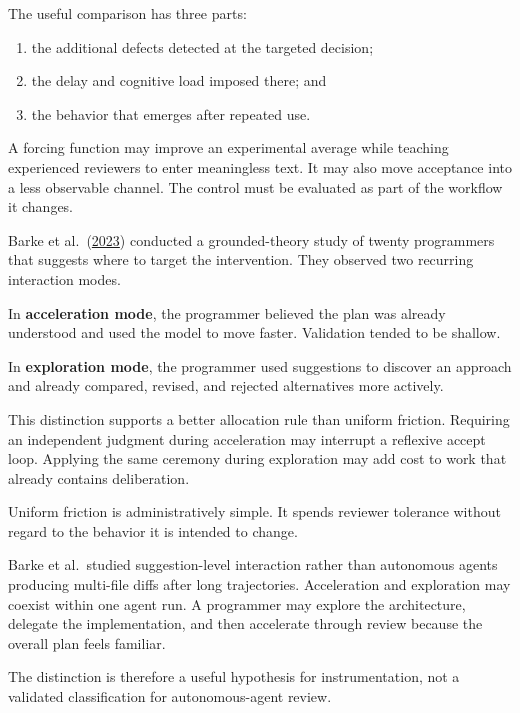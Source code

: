 
The useful comparison has three parts:

\begin{enumerate}
\def\labelenumi{\arabic{enumi}.}
\tightlist
\item
  the additional defects detected at the targeted decision;
\item
  the delay and cognitive load imposed there; and
\item
  the behavior that emerges after repeated use.
\end{enumerate}

A forcing function may improve an experimental average while teaching experienced reviewers to enter meaningless text. It may also move acceptance into a less observable channel. The control must be evaluated as part of the workflow it changes.

Barke et al.~(\href{https://arxiv.org/abs/2206.15000}{2023}) conducted a grounded-theory study of twenty programmers that suggests where to target the intervention. They observed two recurring interaction modes.

In \textbf{acceleration mode}, the programmer believed the plan was already understood and used the model to move faster. Validation tended to be shallow.

In \textbf{exploration mode}, the programmer used suggestions to discover an approach and already compared, revised, and rejected alternatives more actively.

This distinction supports a better allocation rule than uniform friction. Requiring an independent judgment during acceleration may interrupt a reflexive accept loop. Applying the same ceremony during exploration may add cost to work that already contains deliberation.

Uniform friction is administratively simple. It spends reviewer tolerance without regard to the behavior it is intended to change.

Barke et al.~studied suggestion-level interaction rather than autonomous agents producing multi-file diffs after long trajectories. Acceleration and exploration may coexist within one agent run. A programmer may explore the architecture, delegate the implementation, and then accelerate through review because the overall plan feels familiar.

The distinction is therefore a useful hypothesis for instrumentation, not a validated classification for autonomous-agent review.


